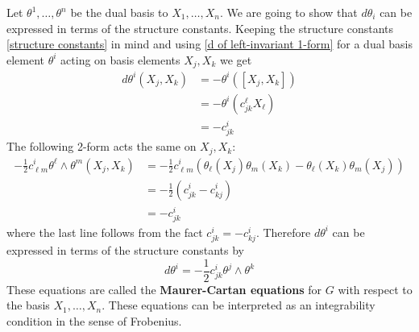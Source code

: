 Let $\theta^1,\ldots,\theta^n$ be the dual basis to $X_1,\ldots,X_n$. We are going to show that $d\theta_i$ can be expressed in terms of the structure constants. Keeping the structure constants \eqref{structure constants} in mind and using \eqref{d of left-invariant 1-form} for a dual basis element $\theta^i$ acting on basis elements $X_j,X_k$ we get
\begin{align*}
	d\theta^i(X_j,X_k) &= -\theta^i\left( [X_j,X_k] \right) \\
	                   &= -\theta^i \left( c_{jk}^\ell X_\ell \right) \\
	                   &= -c_{jk}^i
\end{align*}
The following 2-form acts the same on $X_j,X_k$:
\begin{align*}
	-\frac{1}{2} c_{\ell m}^i \theta^\ell \wedge \theta^m (X_j,X_k) &= -\frac{1}{2} c_{\ell m}^i ( \theta_\ell(X_j)\theta_m(X_k) - \theta_\ell(X_k)\theta_m(X_j) ) \\
	                                                    &= -\frac{1}{2} ( c_{jk}^i - c_{kj}^i ) \\
	                                                    &= -c_{jk}^i
\end{align*}
where the last line follows from the fact $c_{jk}^i = -c_{kj}^i$. Therefore $d\theta^i$ can be expressed in terms of the structure constants by
\begin{equation}
\label{Maurer-Cartan equations in coordinates}
d\theta^i = -\frac{1}{2} c_{jk}^i \theta^j \wedge \theta^k
\end{equation}
These equations are called the \textbf{Maurer-Cartan equations} for $G$ with respect to the basis $X_1,\ldots,X_n$. These equations can be interpreted as an integrability condition in the sense of Frobenius. 

